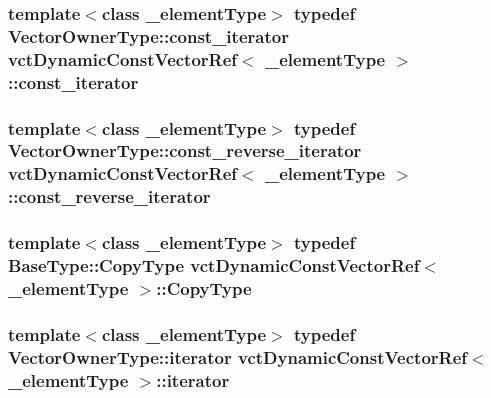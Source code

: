 \subsubsection[{const\+\_\+iterator}]{\setlength{\rightskip}{0pt plus 5cm}template$<$class \+\_\+element\+Type$>$ typedef {\bf Vector\+Owner\+Type\+::const\+\_\+iterator} {\bf vct\+Dynamic\+Const\+Vector\+Ref}$<$ \+\_\+element\+Type $>$\+::{\bf const\+\_\+iterator}}\label{classvct_dynamic_const_vector_ref_a745d586c746244f3326ca5a07c73dea5}
\hypertarget{classvct_dynamic_const_vector_ref_af3fefcebbdfdf747813c57272961cd9d}{}
\subsubsection[{const\+\_\+reverse\+\_\+iterator}]{\setlength{\rightskip}{0pt plus 5cm}template$<$class \+\_\+element\+Type$>$ typedef {\bf Vector\+Owner\+Type\+::const\+\_\+reverse\+\_\+iterator} {\bf vct\+Dynamic\+Const\+Vector\+Ref}$<$ \+\_\+element\+Type $>$\+::{\bf const\+\_\+reverse\+\_\+iterator}}\label{classvct_dynamic_const_vector_ref_af3fefcebbdfdf747813c57272961cd9d}
\hypertarget{classvct_dynamic_const_vector_ref_a32b6a671d547b46f2f972fea2352579a}{}
\subsubsection[{Copy\+Type}]{\setlength{\rightskip}{0pt plus 5cm}template$<$class \+\_\+element\+Type$>$ typedef {\bf Base\+Type\+::\+Copy\+Type} {\bf vct\+Dynamic\+Const\+Vector\+Ref}$<$ \+\_\+element\+Type $>$\+::{\bf Copy\+Type}}\label{classvct_dynamic_const_vector_ref_a32b6a671d547b46f2f972fea2352579a}
\hypertarget{classvct_dynamic_const_vector_ref_ac4d0cbe331233df2f11b5a51d665006f}{}
\subsubsection[{iterator}]{\setlength{\rightskip}{0pt plus 5cm}template$<$class \+\_\+element\+Type$>$ typedef {\bf Vector\+Owner\+Type\+::iterator} {\bf vct\+Dynamic\+Const\+Vector\+Ref}$<$ \+\_\+element\+Type $>$\+::{\bf iterator}}\label{classvct_dynamic_const_vector_ref_ac4d0cbe331233df2f11b5a51d665006f}
\hypertarget{classvct_dynamic_const_vector_ref_a0f78f6ce35765714ea4dc8c182c6dc73}{}

